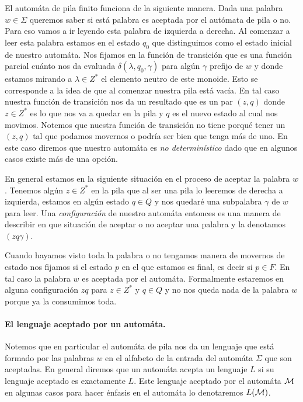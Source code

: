 \documentclass[tesis.tex]{subfiles}
\begin{document}
El automáta de pila finito funciona de la siguiente manera. Dada una palabra $w \in \Sigma$ queremos saber si está palabra es aceptada por el autómata de pila o no.  
Para eso vamos a ir leyendo esta palabra de izquierda a derecha. Al comenzar a leer esta palabra estamos en el estado $q_0$ que distinguimos como el estado inicial de nuestro automáta. Nos fijamos en la función de transición que es una función parcial cuánto nos da evaluada  $\delta(\lambda,q_0,\gamma)$ para algún $\gamma$ prefijo de $w$ y donde estamos mirando a $\lambda \in Z^*$ el elemento neutro de este monoide. Esto se corresponde a la idea de que al comenzar nuestra pila está vacía. En tal caso nuestra función de transición nos da un resultado que es un par $(z,q)$ donde $z \in Z^{*}$ es lo que nos va a quedar en la pila y $q$ es el nuevo estado al cual nos movimos. Notemos que nuestra función de transición no tiene porqué tener un $(z,q)$ tal que podamos movernos o podría ser bien que tenga más de uno. En este caso diremos que nuestro automáta es \textit{no determinístico} dado que en algunos casos existe más de una opción.

En general estamos en la siguiente situación en el proceso de aceptar la palabra $w$. Tenemos algún $z \in Z^{*}$ en la pila que al ser una pila lo leeremos de derecha a izquierda, estamos en algún estado $q \in Q$ y nos quedaré una subpalabra $\gamma$ de $w$ para leer. Una \textit{configuración} de nuestro automáta entonces es una manera de describir en que situación de aceptar o no aceptar una palabra y la denotamos $(zq\gamma)$. 

Cuando hayamos visto toda la palabra o no tengamos manera de movernos de estado nos fijamos si el estado $p$ en el que estamos es final, es decir si $p \in F$. En tal caso la palabra $w$ es aceptada por el automáta. Formalmente estaremos en alguna configuración $zq$ para $z \in Z^*$ y $q \in Q$ y no nos queda nada de la palabra $w$ porque ya la consumimos toda.


\paragraph{El lenguaje aceptado por un automáta.} Notemos que en particular el automáta de pila nos da un lenguaje que está formado por las palabras $w$ en el alfabeto de la entrada del automáta $\Sigma$ que son aceptadas. En general diremos que un automáta acepta un lenguaje $L$ si su lenguaje aceptado es exactamente $L$. Este lenguaje aceptado por el automáta $\cal M$ en algunas casos para hacer énfasis en el automáta lo denotaremos $L {(\cal M)}$.
\end{document}

